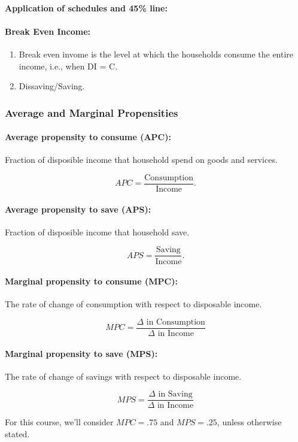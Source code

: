 \paragraph{Application of schedules and 45\% line:}

\paragraph{Break Even Income:}

\begin{enumerate}[label = (\alph*)]
	\item Break even invome is the level at which the households consume the entire income, i.e., when DI = C.

	\item Dissaving/Saving.
\end{enumerate}

\subsubsection{Average and Marginal Propensities}

\paragraph{Average propensity to consume (APC):} Fraction of disposible income that household spend on goods and services.

\[
	APC = \frac{\text{Consumption}}{\text{Income}}.
\]

\paragraph{Average propensity to save (APS):} Fraction of disposible income that household save.

\[
	APS = \frac{\text{Saving}}{\text{Income}}.
\]

\paragraph{Marginal propensity to consume (MPC):} The rate of change of consumption with respect to disposable income.

\[
	MPC = \frac{\Delta \text{ in Consumption}}{\Delta \text{ in Income}}
\]

\paragraph{Marginal propensity to save (MPS):} The rate of change of savings with respect to disposable income.


\[
	MPS = \frac{\Delta \text{ in Saving}}{\Delta \text{ in Income}}
\]

For this course, we'll consider $MPC = .75$ and $MPS = .25$, unless otherwise stated.

